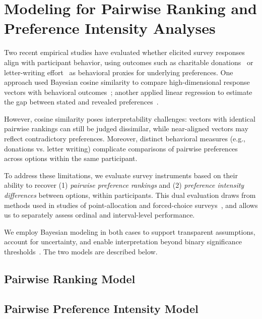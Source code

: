 \section{Modeling for Pairwise Ranking and Preference Intensity Analyses}
\label{sec:quantitative_measures}
Two recent empirical studies have evaluated whether elicited survey responses align with participant behavior, using outcomes such as charitable donations~\cite{chengCanShowWhat2021, cavaille2024cares} or letter-writing effort~\cite{cavaille2024cares} as behavioral proxies for underlying preferences. One approach used Bayesian cosine similarity to compare high-dimensional response vectors with behavioral outcomes~\cite{chengCanShowWhat2021}; another applied linear regression to estimate the gap between stated and revealed preferences~\cite{cavaille2024cares}.

However, cosine similarity poses interpretability challenges: vectors with identical pairwise rankings can still be judged dissimilar, while near-aligned vectors may reflect contradictory preferences. Moreover, distinct behavioral measures (e.g., donations vs. letter writing) complicate comparisons of pairwise preferences across options within the same participant.

To address these limitations, we evaluate survey instruments based on their ability to recover (1) \textit{pairwise preference rankings} and (2) \textit{preference intensity differences} between options, within participants. This dual evaluation draws from methods used in studies of point-allocation and forced-choice surveys~\cite{collewet2023preference}, and allows us to separately assess ordinal and interval-level performance. 

We employ Bayesian modeling in both cases to support transparent assumptions, account for uncertainty, and enable interpretation beyond binary significance thresholds~\cite{mcelreath2018statistical, kay2016researcher}. The two models are described below.

\subsection{Pairwise Ranking Model}
\label{sec:ordinal_measures}


\subsection{Pairwise Preference Intensity Model}
\label{sec:interval_measures}
